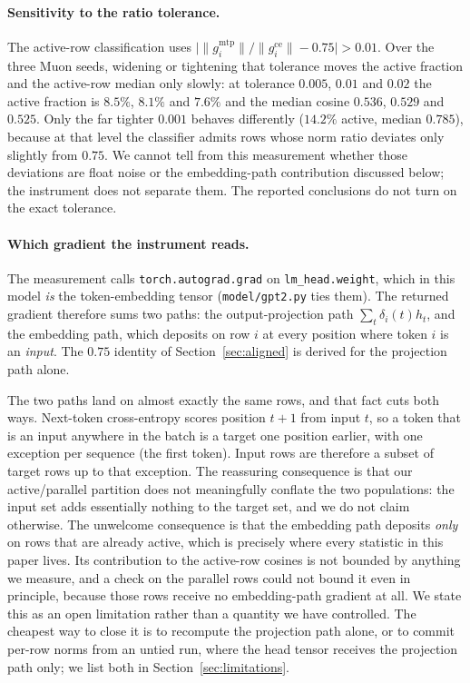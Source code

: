 \paragraph{Sensitivity to the ratio tolerance.} The active-row classification uses
$\lvert \lVert g^{\text{mtp}}_i\rVert / \lVert g^{\text{ce}}_i\rVert - 0.75\rvert > 0.01$.
Over the three Muon seeds, widening or tightening that tolerance moves the active
fraction and the active-row median only slowly: at tolerance $0.005$, $0.01$ and
$0.02$ the active fraction is $8.5\%$, $8.1\%$ and $7.6\%$ and the median cosine
$0.536$, $0.529$ and $0.525$. Only the far tighter $0.001$ behaves differently
($14.2\%$ active, median $0.785$), because at that level the
classifier admits rows whose norm ratio deviates only slightly from $0.75$. We cannot
tell from this measurement whether those deviations are float noise or the
embedding-path contribution discussed below; the instrument does not separate them. The reported conclusions do not
turn on the exact tolerance.

\paragraph{Which gradient the instrument reads.} The measurement calls
\texttt{torch.autograd.grad} on \texttt{lm\_head.weight}, which in this model
\emph{is} the token-embedding tensor (\texttt{model/gpt2.py} ties them). The returned
gradient therefore sums two paths: the output-projection path
$\sum_t \delta_i(t) h_t$, and the embedding path, which deposits on row $i$ at every
position where token $i$ is an \emph{input}. The $0.75$ identity of
Section~\ref{sec:aligned} is derived for the projection path alone.

The two paths land on almost exactly the same rows, and that fact cuts both ways.
Next-token cross-entropy scores position $t{+}1$ from input $t$, so a token that is
an input anywhere in the batch is a target one position earlier, with one exception
per sequence (the first token). Input rows are therefore a subset of target rows up
to that exception. The reassuring consequence is that our active/parallel partition
does not meaningfully conflate the two populations: the input set adds essentially
nothing to the target set, and we do not claim otherwise. The unwelcome consequence
is that the embedding path deposits \emph{only} on rows that are already active,
which is precisely where every statistic in this paper lives. Its contribution to
the active-row cosines is not bounded by anything we measure, and a check on the
parallel rows could not bound it even in principle, because those rows receive no
embedding-path gradient at all. We state this as an open limitation rather than a
quantity we have controlled. The cheapest way to close it is to recompute the
projection path alone, or to commit per-row norms from an untied run, where the head
tensor receives the projection path only; we list both in
Section~\ref{sec:limitations}.

